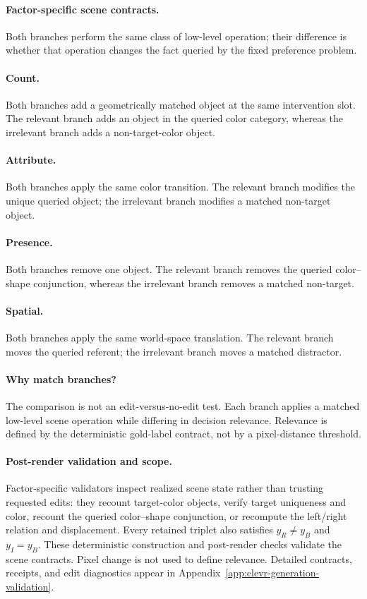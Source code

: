 \paragraph{Factor-specific scene contracts.}
\label{sec:factor_interventions}

Both branches perform the same class of low-level operation; their difference
is whether that operation changes the fact queried by the fixed preference
problem.

\paragraph{Count.} Both branches add a geometrically matched object at the
same intervention slot. The relevant branch adds an object in the queried
color category, whereas the irrelevant branch adds a non-target-color object.

\paragraph{Attribute.} Both branches apply the same color transition. The
relevant branch modifies the unique queried object; the irrelevant branch
modifies a matched non-target object.

\paragraph{Presence.} Both branches remove one object. The relevant branch
removes the queried color--shape conjunction, whereas the irrelevant branch
removes a matched non-target.

\paragraph{Spatial.} Both branches apply the same world-space translation.
The relevant branch moves the queried referent; the irrelevant branch moves a
matched distractor.

\paragraph{Why match branches?} The comparison is not an edit-versus-no-edit
test. Each branch applies a matched low-level scene operation while differing
in decision relevance. Relevance is defined by the deterministic gold-label
contract, not by a pixel-distance threshold.

\paragraph{Post-render validation and scope.}
\label{sec:matching_validation}

Factor-specific validators inspect realized scene state rather than trusting
requested edits: they recount target-color objects, verify target uniqueness
and color, recount the queried color--shape conjunction, or recompute the
left/right relation and displacement. Every retained triplet also satisfies
$y_R\neq y_B$ and $y_I=y_B$. These deterministic construction and post-render
checks validate the scene contracts. Pixel change is not used to define
relevance. Detailed
contracts, receipts, and edit diagnostics appear in
Appendix~\ref{app:clevr-generation-validation}.
